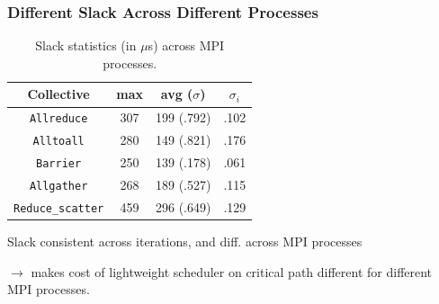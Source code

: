 \begin{frame}
\frametitle{Different Slack Across Different Processes}
\vspace*{-0.3in}

\begin{table}[tr]
\label{fig:collectiveSlack-useq}
  \begin{center}
    \begin{tabular}{ | c || c | c || c |  }
      \hline
      \textbf{Collective}  &      \textbf{max} & \textbf{avg ($\sigma$)} & \textbf{$\sigma_i$}  \\ \hline
      \texttt{Allreduce} &             307    &    199 (.792) &            .102                  \\ \hline
      \texttt{Alltoall}  &             280    &    149 (.821) &            .176                  \\ \hline
      \texttt{Barrier}  &              250    &    139 (.178)  &           .061                  \\ \hline
      \texttt{Allgather} &             268    &    189 (.527) &            .115                  \\ \hline
      \texttt{Reduce\_scatter} &       459    &    296  (.649)  &          .129                  \\ \hline
    \end{tabular}
  \end{center}
  \caption{\label{fig:collectiveSlack-useq}
    Slack statistics (in $\mu$s) across MPI processes.}
{\small Slack consistent across iterations, and diff. across MPI processes } \\
\end{table}
{\small $\rightarrow$ makes cost of lightweight scheduler on critical path different for different MPI processes.} 
\end{frame}

